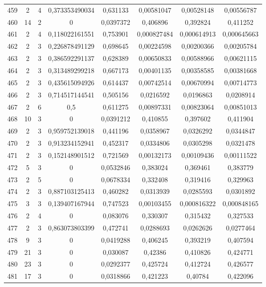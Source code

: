 \begin{longtable}{|c|c|c|c|c|c|c|c|}
459 & 2 & 4 & 0,373353490034 & 0,631133 & 0,00581047 & 0,00528148 & 0,00556787  \\
460 & 14 & 2 & 0 & 0,0397372 & 0,406896 & 0,392824 & 0,411252  \\
461 & 2 & 4 & 0,118022161551 & 0,753901 & 0,000827484 & 0,000614913 & 0,000645663  \\
462 & 2 & 3 & 0,226878491129 & 0,698645 & 0,00224598 & 0,00200366 & 0,00205784  \\
463 & 2 & 3 & 0,386592291137 & 0,628389 & 0,00650833 & 0,00588966 & 0,00621115  \\
464 & 2 & 3 & 0,313489299218 & 0,667173 & 0,00401135 & 0,00358585 & 0,00381668  \\
465 & 2 & 3 & 0,435615094926 & 0,614437 & 0,00742514 & 0,00670994 & 0,00714773  \\
466 & 2 & 3 & 0,714517144541 & 0,505156 & 0,0216592 & 0,0196863 & 0,0208914  \\
467 & 2 & 6 & 0,5 & 0,611275 & 0,00897331 & 0,00823064 & 0,00851013  \\
468 & 10 & 3 & 0 & 0,0391212 & 0,410855 & 0,397602 & 0,411904  \\
469 & 2 & 3 & 0,959752139018 & 0,441196 & 0,0358967 & 0,0326292 & 0,0344847  \\
470 & 2 & 3 & 0,913234152941 & 0,452317 & 0,0334806 & 0,0305298 & 0,0321478  \\
471 & 2 & 3 & 0,152148901512 & 0,721569 & 0,00132173 & 0,00109436 & 0,00111522  \\
472 & 5 & 3 & 0 & 0,0532846 & 0,383024 & 0,369461 & 0,383779  \\
473 & 2 & 5 & 0 & 0,0678334 & 0,332408 & 0,319416 & 0,329963  \\
474 & 2 & 3 & 0,887103125413 & 0,460282 & 0,0313939 & 0,0285593 & 0,0301892  \\
475 & 3 & 3 & 0,139407167944 & 0,747523 & 0,00103455 & 0,000816322 & 0,000848165  \\
476 & 2 & 4 & 0 & 0,083076 & 0,330307 & 0,315432 & 0,327533  \\
477 & 2 & 3 & 0,863073803399 & 0,472741 & 0,0288693 & 0,0262626 & 0,0277464  \\
478 & 9 & 3 & 0 & 0,0419288 & 0,406245 & 0,393219 & 0,407594  \\
479 & 21 & 3 & 0 & 0,030087 & 0,42386 & 0,410826 & 0,424771  \\
480 & 23 & 3 & 0 & 0,0292377 & 0,425724 & 0,412724 & 0,426577  \\
481 & 17 & 3 & 0 & 0,0318866 & 0,421223 & 0,40784 & 0,422096  \\

\end{longtable}

